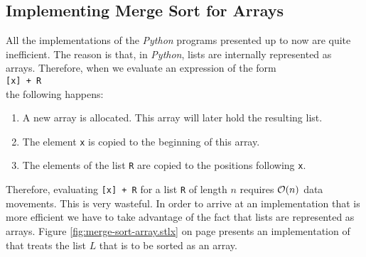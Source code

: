 \subsection{Implementing Merge Sort for Arrays}
All the implementations of the \textsl{Python} programs presented up to now are quite inefficient.  The
reason is that, in \textsl{Python}, lists are internally represented as arrays.  Therefore, when
we evaluate an expression of the form 
\\[0.2cm]
\hspace*{1.3cm}
\texttt{[x] + R}
\\[0.2cm]
the following happens:
\begin{enumerate}
\item A new array is allocated.  This array will later hold the resulting list.
\item The element \texttt{x} is copied to the beginning of this array.
\item The elements of the list \texttt{R} are copied to the positions following \texttt{x}.
\end{enumerate}
Therefore, evaluating \texttt{[x] + R} for a list \texttt{R} of length $n$ requires $\mathcal{O}(n)$ data
movements.  This is very wasteful.  In order to arrive at an
implementation that is more efficient we have to take advantage of the fact that lists are represented as arrays.
Figure \ref{fig:merge-sort-array.stlx} on page \pageref{fig:merge-sort-array.stlx} presents
an implementation of  that treats the list $L$ that is to be sorted as an array.


